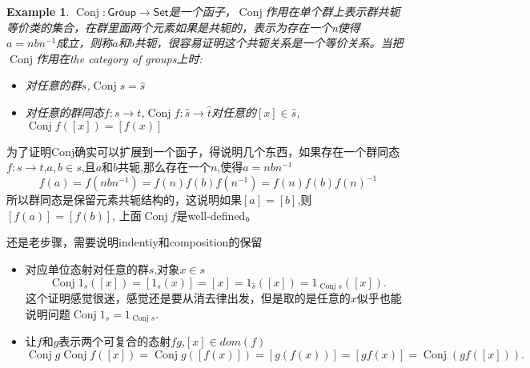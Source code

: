 \documentclass{article}
\newtheorem{example}[theorem]{Example}
\newcommand{\Set}{\textsf{Set}\xspace}
\newcommand{\Group}{\textsf{Group}\xspace}
\newcommand*{\xfunc}[4]{{#2}\colon{#3}{#1}{#4}}
\newcommand*{\func}[3]{\xfunc{\to}{#1}{#2}{#3}}
\DeclareMathOperator{\Conj}{Conj}
\begin{document}
\begin{example}
\rm $\func{\Conj}{\Group}{\Set}$是一个函子，$\Conj$作用在单个群上表示群共轭等价类的集合，在群里面两个元素如果是共轭的，表示为存在一个n使得$a=nbn^{-1}$成立，则称$a$和$b$共轭，很容易证明这个共轭关系是一个等价关系。当把$\Conj$作用在\emph{the category of groups}上时:
	\begin{itemize}
		\item 对任意的群$s$,\(\Conj s = \hat{s}\)
		\item 对任意的群同态\(\func{f}{s}{t}\),\(\func{\Conj f}{\hat{s}}{\hat{t}}\)对任意的\([x] \in \hat{s}\),\(\Conj f([x])=[f(x)]\)
	\end{itemize}
\end{example}

为了证明Conj确实可以扩展到一个函子，得说明几个东西，如果存在一个群同态$\func{f}{s}{t}$,$a,b \in s$,且$a$和$b$共轭,那么存在一个$n$,使得$a=nbn^{-1}$ \[f(a)=f(nbn^{-1})=f(n)f(b)f(n^{-1})=f(n)f(b)f(n)^{-1}\]所以群同态是保留元素共轭结构的，这说明如果$[a]=[b]$,则$[f(a)]=[f(b)]$, 上面$\Conj f$是well-defined。

还是老步骤，需要说明indentiy和composition的保留
\begin{itemize}
	\item 对应单位态射对任意的群$s$,对象$x \in s$ \[\Conj 1_s([x])=[1_s(x)]=[x]=1_{\hat{s}}([x])=1_{\Conj s}([x]).\]这个证明感觉很迷，感觉还是要从消去律出发，但是取的是任意的$x$似乎也能说明问题$\Conj 1_s = 1_{\Conj s}$.
	\item 让$f$和$g$表示两个可复合的态射$fg$,$[x] \in dom(f)$ \[\Conj g\Conj f([x])=\Conj g([f(x)])=[g(f(x))]=[gf(x)]=\Conj (gf([x])).\]
\end{itemize}

\newpage
\end{document}
